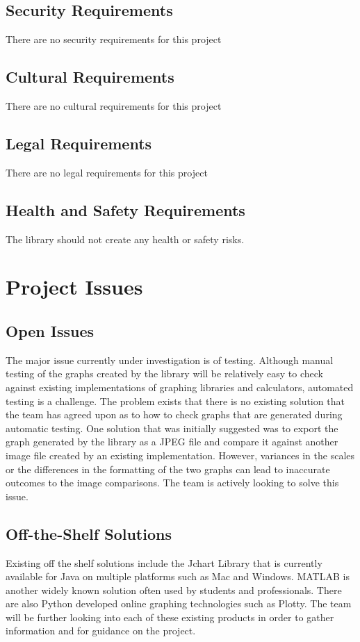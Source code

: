 \documentclass[12pt, titlepage]{article}
\begin{document}
\subsection{Security Requirements}
There are no security requirements for this project
\subsection{Cultural Requirements}
There are no cultural requirements for this project
\subsection{Legal Requirements}
There are no legal requirements for this project
\subsection{Health and Safety Requirements} %

The library should not create any health or safety risks.

\clearpage
\section{Project Issues}

\subsection{Open Issues}
The major issue currently under investigation is of testing. Although manual testing of the graphs created by the library will be relatively easy to check against existing implementations of graphing libraries and calculators, automated testing is a challenge. The problem exists that there is no existing solution that the team has agreed upon as to how to check graphs that are generated during automatic testing. One solution that was initially suggested was to export the graph generated by the library as a JPEG file and compare it against another image file created by an existing implementation. However, variances in the scales or the differences in the formatting of the two graphs can lead to inaccurate outcomes to the image comparisons. The team is actively looking to solve this issue. 
\subsection{Off-the-Shelf Solutions}
Existing off the shelf solutions include the Jchart Library that is currently available for Java on multiple platforms such as Mac and Windows. MATLAB is another widely known solution often used by students and professionals. There are also Python developed online graphing technologies such as Plotty. The team will be further looking into each of these existing products in order to gather information and for guidance on the project. 
\end{document}
